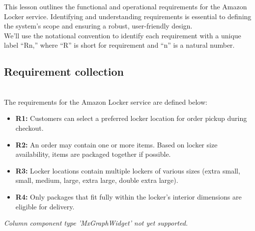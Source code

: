 

This lesson outlines the functional and operational requirements for the Amazon Locker service. Identifying and understanding requirements is essential to defining the system's scope and ensuring a robust, user-friendly design.
\\
We'll use the notational convention to identify each requirement with a unique label ``Rn,'' where ``R'' is short for requirement and ``n'' is a natural number.

\subsection{Requirement collection}\label{slaPtV0hrXKeJxBPF9gA3}
\\
The requirements for the Amazon Locker service are defined below:

\noindent
\begin{minipage}[t]{0.48\textwidth}\vspace{0pt}
\begin{itemize}
\item
\textbf{R1:} Customers can select a preferred locker location for order pickup during checkout.
\item
\textbf{R2:} An order may contain one or more items. Based on locker size availability, items are packaged together if possible.
\item
\textbf{R3:} Locker locations contain multiple lockers of various sizes (extra small, small, medium, large, extra large, double extra large).
\item
\textbf{R4:} Only packages that fit fully within the locker's interior dimensions are eligible for delivery.
\end{itemize}
\end{minipage}
\hfill
\begin{minipage}[t]{0.48\textwidth}\vspace{0pt}
\textit{Column component type 'MxGraphWidget' not yet supported.}
\end{minipage}

